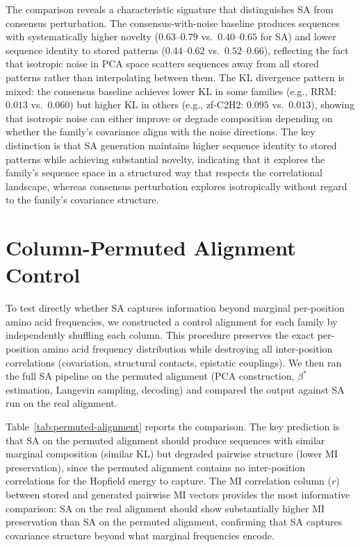 The comparison reveals a characteristic signature that distinguishes SA from consensus perturbation. The consensus-with-noise baseline produces sequences with systematically higher novelty ($0.63$--$0.79$ vs.\ $0.40$--$0.65$ for SA) and lower sequence identity to stored patterns ($0.44$--$0.62$ vs.\ $0.52$--$0.66$), reflecting the fact that isotropic noise in PCA space scatters sequences away from all stored patterns rather than interpolating between them. The KL divergence pattern is mixed: the consensus baseline achieves lower KL in some families (e.g., RRM: $0.013$ vs.\ $0.060$) but higher KL in others (e.g., zf-C2H2: $0.095$ vs.\ $0.013$), showing that isotropic noise can either improve or degrade composition depending on whether the family's covariance aligns with the noise directions. The key distinction is that SA generation maintains higher sequence identity to stored patterns while achieving substantial novelty, indicating that it explores the family's sequence space in a structured way that respects the correlational landscape, whereas consensus perturbation explores isotropically without regard to the family's covariance structure.

\section{Column-Permuted Alignment Control}\label{si:permuted-alignment}

To test directly whether SA captures information beyond marginal per-position amino acid frequencies, we constructed a control alignment for each family by independently shuffling each column. This procedure preserves the exact per-position amino acid frequency distribution while destroying all inter-position correlations (covariation, structural contacts, epistatic couplings). We then ran the full SA pipeline on the permuted alignment (PCA construction, $\beta^*$ estimation, Langevin sampling, decoding) and compared the output against SA run on the real alignment.

Table~\ref{tab:permuted-alignment} reports the comparison. The key prediction is that SA on the permuted alignment should produce sequences with similar marginal composition (similar KL) but degraded pairwise structure (lower MI preservation), since the permuted alignment contains no inter-position correlations for the Hopfield energy to capture. The MI correlation column ($r$) between stored and generated pairwise MI vectors provides the most informative comparison: SA on the real alignment should show substantially higher MI preservation than SA on the permuted alignment, confirming that SA captures covariance structure beyond what marginal frequencies encode.

